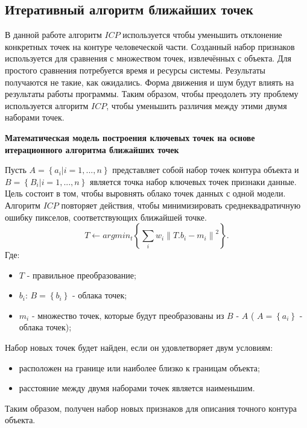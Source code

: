 \subsection{Итеративный алгоритм ближайших точек}

В данной работе алгоритм $ICP$ используется чтобы уменьшить отклонение конкретных точек на контуре человеческой части. Созданный набор признаков используется для сравнения с множеством точек, извлечённых с объекта. Для простого сравнения потребуется время и ресурсы системы. Результаты получаются не такие, как ожидались. Форма движения и шум будут влиять на результаты работы программы. Таким образом, чтобы преодолеть эту проблему используется алгоритм $ICP$, чтобы уменьшить различия между этими двумя наборами точек.

\textbf{Математическая модель построения ключевых точек на основе итерационного алгоритма ближайших точек}

Пусть $A=\left\{a_i| i=1, ..., n\right\}$ представляет собой набор точек контура объекта и $B=\left\{B_i| i=1, ..., n\right\}$ является точка набор ключевых точек признаки данные. Цель состоит в том, чтобы выровнять облако точек данных с одной модели.
Алгоритм $ICP$ повторяет действия, чтобы минимизировать среднеквадратичную ошибку пикселов, соответствующих ближайшей точке.
\begin{equation}\label{eq26}
T\leftarrow argmin_t\left\{\sum_i w_i\left\|T.b_i - m_i\right\|^2\right\}.
\end{equation}
Где:

\begin{itemize}
	\item $T$ - правильное преобразование;
	\item $b_i$: $B=\left\{b_i\right\}$ - облака точек;
	\item $m_i$ - множество точек, которые будут преобразованы из $B$ - $A$ ( $A=\left\{a_i\right\}$ - облака точек);
\end{itemize}

Набор новых точек будет найден, если он удовлетворяет двум условиям:

\begin{itemize}
	\item расположен на границе или наиболее близко к границам объекта;
	\item расстояние между двумя наборами точек является наименьшим.
\end{itemize}
Таким образом, получен набор новых признаков для описания точного контура объекта.

